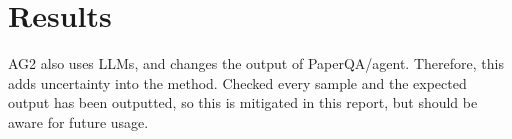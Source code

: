 \section{Results}
\label{sec:results}

AG2 also uses LLMs, and changes the output of PaperQA/agent. Therefore, this adds uncertainty into the method. Checked every sample and the expected output has been outputted, so this is mitigated in this report, but should be aware for future usage. 